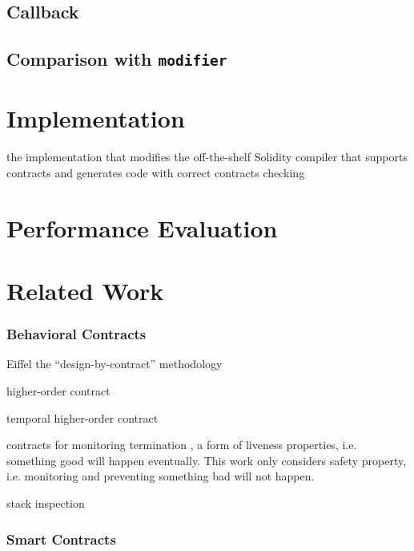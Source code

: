 \documentclass[acmsmall,review,anonymous]{acmart}\settopmatter{printfolios=true,printccs=false,printacmref=false}
\begin{document}
\subsection{Callback}

\subsection{Comparison with \texttt{modifier}}


\section{Implementation}

the implementation that modifies the off-the-shelf Solidity compiler that
supports contracts and generates code with correct contracts checking


\section{Performance Evaluation}

\section{Related Work}

\subsubsection*{\textbf{Behavioral Contracts}}

Eiffel the ``design-by-contract'' methodology \cite{DBLP:books/ph/Meyer91, DBLP:conf/tools/Meyer98a}

higher-order contract \cite{DBLP:conf/icfp/FindlerF02}

temporal higher-order contract \cite{DBLP:conf/icfp/DisneyFM11}

contracts for monitoring termination \cite{DBLP:conf/pldi/NguyenGTH19}, a form
of liveness properties, i.e.
something good will happen eventually.
This work only considers safety property, i.e. monitoring and preventing
something bad will not happen.

stack inspection \cite{DBLP:conf/popl/FournetG02, DBLP:conf/sp/WallachF98}

\subsubsection*{\textbf{Smart Contracts}}
\end{document}
